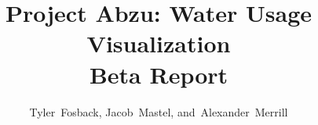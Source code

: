 \documentclass[journal]{IEEEtran}
\begin{document}
\onecolumn
%
\title{Project Abzu: Water Usage Visualization \\
  \LARGE Beta Report}
%
%
%

\author{Tyler~Fosback,
    Jacob~Mastel,
        and~Alexander~Merrill
        }%
\end{document}
